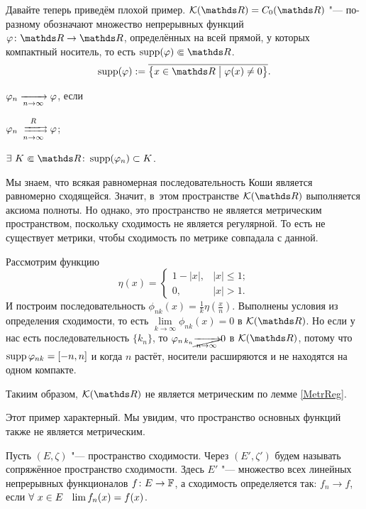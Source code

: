Давайте теперь приведём плохой пример. $\mathcal K(\R) = C_0(\R)$ "--- по-разному обозначают множество непрерывных функций $\phi\colon \R\to\R$, определённых на всей прямой, у которых компактный носитель, то есть $\supp(\phi) \spp \R$.
\[
  \supp(\phi):=\overline{\big\{x\in\R\bigm|\phi(x)\ne0\big\}}.
\]
\begin{Def}
  $\varphi_n\xrightarrow[n\rightarrow\infty]{}\varphi$, если
\begin{roItems}
\item $\phi_n \rsh[R]n\phi$;
\item $\exists\ K\spp\R\colon \supp(\phi_n)\subset K$.
\end{roItems}
\end{Def}

Мы знаем, что всякая равномерная последовательность Коши является равномерно сходящейся. Значит, в~этом пространстве $\mathcal K(\R)$ выполняется аксиома полноты. Но однако, это пространство не является метрическим пространством, поскольку сходимость не является регулярной. То есть не существует метрики, чтобы сходимость по метрике совпадала с данной.

\begin{Proof}
Рассмотрим функцию
\[
\eta(x) = \begin{cases}
  1-|x|,&|x|\le1;\\
 0,&|x|>1.
\end{cases}
\]
И построим последовательность $\phi_{nk}(x) = \frac1k\eta\left(\frac xn\right)$. Выполнены условия из определения сходимости, то есть $\lim\limits_{k\to\infty}\phi_{nk}(x) = 0$ в $\mathcal K(\R)$. Но если у нас есть последовательность $\{k_n\}$, то $\varphi_{n\,k_n}\cancel{\xrightarrow[n\rightarrow\infty]{}}0$ в $\mathcal K(\R)$, потому что $\operatorname{supp}\varphi_{nk} = [-n,n]$ и когда $n$ растёт, носители расширяются и не находятся на одном компакте. 

Такиим образом, $\mathcal K(\R)$ не является метрическим по лемме \ref{MetrReg}.
\end{Proof}

Этот пример характерный. Мы увидим, что пространство основных функций также не является метрическим.

\begin{Def}
Пусть $(E,\zeta)$ "--- пространство сходимости. Через $(E',\zeta')$ будем называть сопряжённое пространство сходимости. Здесь $E'$ "--- множество всех линейных непрерывных функционалов $f\colon E\rightarrow\mathbb F$, а сходимость определяется так: $f_n\to f$, если $\forall\ x\in E\pau \lim f_n(x) = f(x)$.
\end{Def}

